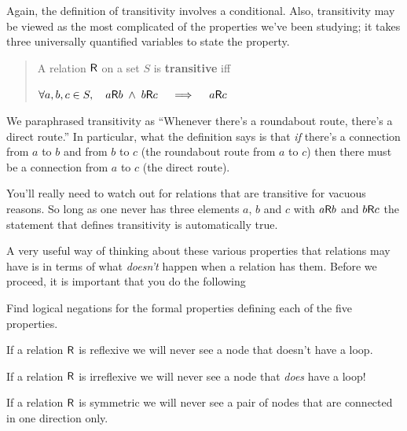 Again, the definition of transitivity involves a conditional.  Also, transitivity may be viewed 
as the most complicated of the properties we've been studying; it takes three universally 
quantified variables to state the property.

\begin{quote}
A relation $\mbox{\textsf R}$ on a set $S$ is {\bf transitive} iff \newline
\centerline{ $\displaystyle \forall a,b,c \in S, \quad a \mbox{\textsf R} b \; \land \; b \mbox{\textsf R} c \quad \implies \quad a \mbox{\textsf R} c$ }
\end{quote}

We paraphrased transitivity as  ``Whenever there's a roundabout route, there's a direct route.''
In particular, what the definition says is that \emph{if} there's a connection from $a$ to $b$ and from
$b$ to $c$ (the roundabout route from $a$ to $c$) then there must be a connection from $a$ to $c$ (the direct
route).  

You'll really need to watch out for relations that are transitive for vacuous reasons.  So long as one
never has three elements $a$, $b$ and $c$ with $a \mbox{\textsf R} b$ and $b \mbox{\textsf R} c$ the statement that defines
transitivity is automatically true.

A very useful way of thinking about these various properties that relations may have is in terms of 
what \emph{doesn't} happen when a relation has them.  Before we proceed, it is important that 
you do the following

\begin{exer}
Find logical negations for the formal properties defining each of the five
properties.
\end{exer}

\newpage

If a relation $\mbox{\textsf R}$ is reflexive we will never see a node that doesn't have a loop.

\begin{center}

\end{center}

\vfill

If a relation $\mbox{\textsf R}$ is irreflexive we will never see a node that \emph{does} have a loop!

\begin{center}

\end{center}

\vfill

If a relation $\mbox{\textsf R}$ is symmetric we will never see a pair of nodes that are connected in one
direction only.

